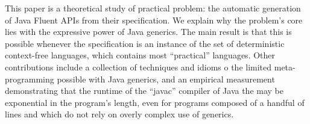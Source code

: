 This paper is a theoretical study of practical problem:
  the automatic generation of Java Fluent APIs from their specification.
We explain why the problem's core lies with 
  the expressive power of Java generics.
The main result is that this is possible whenever 
  the specification is an instance of the set of deterministic context-free languages,
  which contains most ``practical'' languages.
Other contributions include a collection of techniques and idioms o
  the limited meta-programming possible with Java generics, 
  and an empirical measurement demonstrating that the runtime of
  the ``javac'' compiler of Java the may be exponential in
  the program's length, even for programs composed of 
  a handful of lines and which do not rely on overly 
  complex use of generics.
